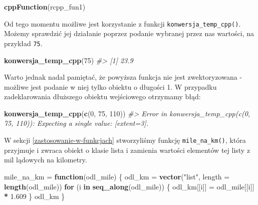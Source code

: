 \documentclass[paper=6in:9in,pagesize=pdftex,headinclude=on,footinclude=on,10pt]{scrbook}
\newenvironment{Shaded}{\begin{snugshade}}{\end{snugshade}}
\newcommand{\CommentTok}[1]{\textcolor[rgb]{0.56,0.35,0.01}{\textit{#1}}}
\newcommand{\ControlFlowTok}[1]{\textcolor[rgb]{0.13,0.29,0.53}{\textbf{#1}}}
\newcommand{\DataTypeTok}[1]{\textcolor[rgb]{0.13,0.29,0.53}{#1}}
\newcommand{\DecValTok}[1]{\textcolor[rgb]{0.00,0.00,0.81}{#1}}
\newcommand{\FloatTok}[1]{\textcolor[rgb]{0.00,0.00,0.81}{#1}}
\newcommand{\KeywordTok}[1]{\textcolor[rgb]{0.13,0.29,0.53}{\textbf{#1}}}
\newcommand{\NormalTok}[1]{#1}
\newcommand{\OperatorTok}[1]{\textcolor[rgb]{0.81,0.36,0.00}{\textbf{#1}}}
\newcommand{\StringTok}[1]{\textcolor[rgb]{0.31,0.60,0.02}{#1}}
\begin{document}
\begin{Shaded}
\begin{Highlighting}[]
\KeywordTok{cppFunction}\NormalTok{(rcpp_fun1)}
\end{Highlighting}
\end{Shaded}

Od tego momentu możliwe jest korzystanie z funkcji \texttt{konwersja\_temp\_cpp()}.
Możemy sprawdzić jej działanie poprzez podanie wybranej przez nas wartości, na przykład \texttt{75}.

\begin{Shaded}
\begin{Highlighting}[]
\KeywordTok{konwersja_temp_cpp}\NormalTok{(}\DecValTok{75}\NormalTok{)}
\CommentTok{#> [1] 23.9}
\end{Highlighting}
\end{Shaded}

Warto jednak nadal pamiętać, że powyższa funkcja nie jest zwektoryzowana - możliwe jest podanie w niej tylko obiektu o długości 1.
W przypadku zadeklarowania dłuższego obiektu wejściowego otrzymamy błąd:

\begin{Shaded}
\begin{Highlighting}[]
\KeywordTok{konwersja_temp_cpp}\NormalTok{(}\KeywordTok{c}\NormalTok{(}\DecValTok{0}\NormalTok{, }\DecValTok{75}\NormalTok{, }\DecValTok{110}\NormalTok{))}
\CommentTok{#> Error in konwersja_temp_cpp(c(0, 75, 110)): Expecting a single value: [extent=3].}
\end{Highlighting}
\end{Shaded}

W sekcji \ref{zastosowanie-w-funkcjach} stworzyliśmy funkcję \texttt{mile\_na\_km()}, która przyjmuje i zwraca obiekt o klasie lista i zamienia wartości elementów tej listy z mil lądowych na kilometry.

\begin{Shaded}
\begin{Highlighting}[]
\NormalTok{mile_na_km =}\StringTok{ }\ControlFlowTok{function}\NormalTok{(odl_mile) \{}
\NormalTok{  odl_km =}\StringTok{ }\KeywordTok{vector}\NormalTok{(}\StringTok{"list"}\NormalTok{, }\DataTypeTok{length =} \KeywordTok{length}\NormalTok{(odl_mile))}
  \ControlFlowTok{for}\NormalTok{ (i }\ControlFlowTok{in} \KeywordTok{seq_along}\NormalTok{(odl_mile)) \{}
\NormalTok{    odl_km[[i]] =}\StringTok{ }\NormalTok{odl_mile[[i]] }\OperatorTok{*}\StringTok{ }\FloatTok{1.609}
\NormalTok{  \}}
\NormalTok{  odl_km}
\NormalTok{\}}
\end{Highlighting}
\end{Shaded}
\end{document}
